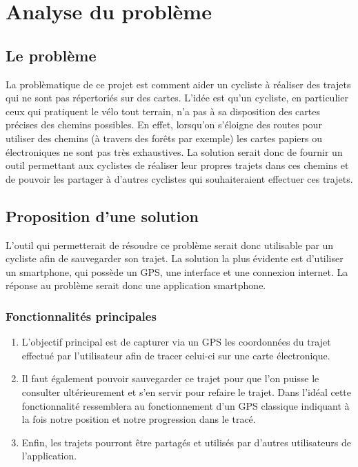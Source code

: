 \section{Analyse du problème}
\subsection{Le problème}
La problèmatique de ce projet est comment aider un cycliste à réaliser des trajets qui ne sont pas répertoriés sur des cartes. L'idée est qu'un cycliste, 
en particulier ceux qui pratiquent le vélo tout terrain, n'a pas à sa disposition des cartes précises des chemins possibles. En effet,
lorsqu'on s'éloigne des routes pour utiliser des chemins (à travers des forêts par exemple) les cartes papiers ou électroniques ne sont pas
très exhaustives. La solution serait donc de fournir un outil permettant aux cyclistes de réaliser leur propres trajets dans ces
chemins et de pouvoir les partager à d'autres cyclistes qui souhaiteraient effectuer ces trajets.

\subsection{Proposition d'une solution}
L'outil qui permetterait de résoudre ce problème serait donc utilisable par un cycliste afin de sauvegarder son trajet. La solution la plus évidente
est d'utiliser un smartphone, qui possède un GPS, une interface et une connexion internet. La réponse au problème serait donc une application
smartphone.

\subsubsection{Fonctionnalités principales}
\begin{enumerate}
  \item L'objectif principal est de capturer via un GPS les coordonnées du trajet effectué par l'utilisateur afin de tracer celui-ci sur une carte
  électronique.
  \item Il faut également pouvoir sauvegarder ce trajet pour que l'on puisse le consulter ultérieurement et s'en servir pour refaire le trajet.
  Dans l'idéal cette fonctionnalité ressemblera au fonctionnement d'un GPS classique indiquant à la fois notre position et notre progression dans le tracé.
  \item Enfin, les trajets pourront être partagés et utilisés par d'autres utilisateurs de l'application.
\end{enumerate}

